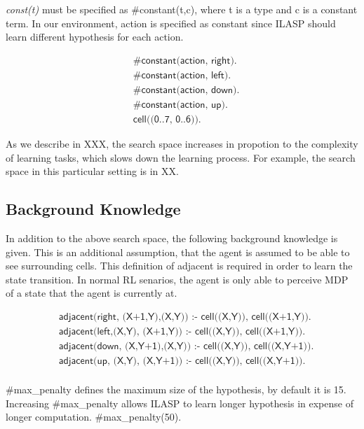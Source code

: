 \textit{const(t)} must be specified as \#constant(t,c), where t is a type and c is a constant term.
In our environment, action is specified as constant since ILASP should learn different hypothesis for each action.

\begin{equation}
\begin{split}
&\textsf{\#constant(action, right).}\\
&\textsf{\#constant(action, left).}\\
&\textsf{\#constant(action, down).}\\
&\textsf{\#constant(action, up).}\\
&\textsf{cell((0..7, 0..6)).}
\end{split}
\end{equation}

As we describe in XXX, the search space increases in propotion to the complexity of learning tasks, which slows down the learning process.
For example, the search space in this particular setting is in XX.

\subsection{Background Knowledge}

In addition to the above search space, the following background knowledge is given. This is an additional assumption, 
that the agent is assumed to be able to see surrounding cells. This definition of adjacent is required in order to learn the state transition.
In normal RL senarios, the agent is only able to perceive MDP of a state that the agent is currently at. 

\begin{equation}
\begin{split}
&\textsf{adjacent(right, (X+1,Y),(X,Y)) :- cell((X,Y)), cell((X+1,Y)).} \\
&\textsf{adjacent(left,(X,Y),  (X+1,Y)) :- cell((X,Y)), cell((X+1,Y)).} \\
&\textsf{adjacent(down, (X,Y+1),(X,Y)) :- cell((X,Y)), cell((X,Y+1)).} \\
&\textsf{adjacent(up,   (X,Y),  (X,Y+1)) :- cell((X,Y)), cell((X,Y+1)).} \\
\end{split}
\end{equation}

\#max\_penalty defines the maximum size of the hypothesis, by default it is 15.
Increasing \#max\_penalty allows ILASP to learn longer hypothesis in expense of longer computation.
\#max\_penalty(50).

